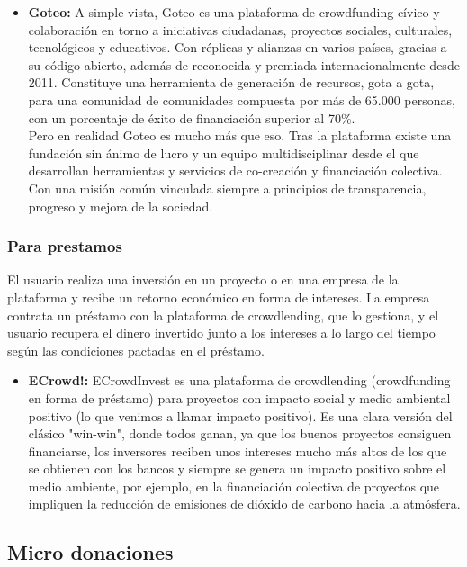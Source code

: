 \begin{itemize}
	\item \textbf{Goteo:} \smallbreak
	A simple vista, Goteo es una plataforma de crowdfunding cívico y colaboración en torno a iniciativas ciudadanas, proyectos sociales, culturales, tecnológicos y educativos. Con réplicas y alianzas en varios países, gracias a su código abierto, además de reconocida y premiada internacionalmente desde 2011. Constituye una herramienta de generación de recursos, gota a gota, para una comunidad de comunidades compuesta por más de 65.000 personas, con un porcentaje de éxito de financiación superior al 70\%.\\
	Pero en realidad Goteo es mucho más que eso. Tras la plataforma existe una fundación sin ánimo de lucro y un equipo multidisciplinar desde el que desarrollan herramientas y servicios de co-creación y financiación colectiva. Con una misión común vinculada siempre a principios de transparencia, progreso y mejora de la sociedad.
\end{itemize}

\subsubsection{Para prestamos}
El usuario realiza una inversión en un proyecto o en una empresa de la plataforma y recibe un retorno económico en forma de intereses. La empresa contrata un préstamo con la plataforma de crowdlending, que lo gestiona, y el usuario recupera el dinero invertido junto a los intereses a lo largo del tiempo según las condiciones pactadas en el préstamo.

\begin{itemize}
	\item \textbf{ECrowd!:} \smallbreak
	ECrowdInvest es una plataforma de crowdlending (crowdfunding en forma de préstamo) para proyectos con impacto social y medio ambiental positivo (lo que venimos a llamar impacto positivo). Es una clara versión del clásico "win-win", donde todos ganan, ya que los buenos proyectos consiguen financiarse, los inversores reciben unos intereses mucho más altos de los que se obtienen con los bancos y siempre se genera un impacto positivo sobre el medio ambiente, por ejemplo, en la financiación colectiva de proyectos que impliquen la reducción de emisiones de dióxido de carbono hacia la atmósfera.
\end{itemize}


\subsection{Micro donaciones}

